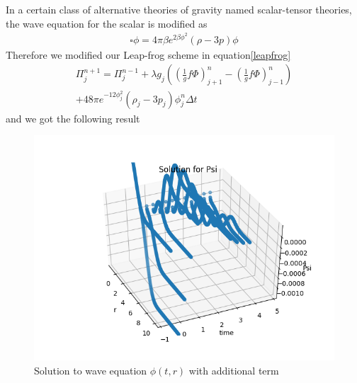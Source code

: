 \documentclass[aps,twocolumn,showpacs,preprintnumbers,nofootinbib,prl,superscriptaddress,groupedaddress]{revtex4-1}
\begin{document}
In a certain class of alternative theories of gravity named scalar-tensor theories, the wave equation for the scalar is modified as
\begin{align}\label{modified eq}
	\square\phi = 4\pi\beta e^{ 2\beta\phi^2}(\rho- 3p)\phi
\end{align}
Therefore we modified our Leap-frog scheme in equation\ref{leapfrog}
\begin{align}
		\Pi_{j}^{n+1} = \Pi_j^{n-1} + \lambda g_j((\frac{1}{g}f\Phi)^n_{j+1} - (\frac{1}{g}f\Phi)^n_{j-1}) \\
		+ 48\pi e^{-12\phi_{j}^2}(\rho_j-3p_j)\phi_{j}^n\Delta t
\end{align}
and we got the following result
\begin{figure}
	\centering
	\includegraphics[width=1\linewidth]{Figures/Beyond_Einstein_Figures/wave_equation_termadded}
	\caption{Solution to wave equation $ \phi(t,r) $ with additional term}
	\label{fig:waveequationtermadded}
\end{figure}
\end{document}
